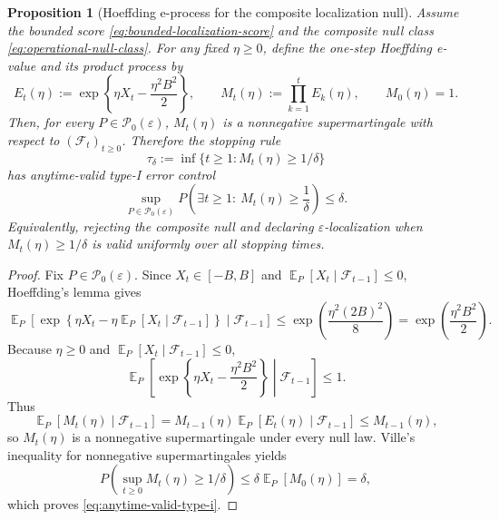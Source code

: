 \documentclass[11pt]{article}
\newtheorem{proposition}[theorem]{Proposition}
\DeclareMathOperator{\E}{\mathbb{E}}
\begin{document}
\begin{proposition}[Hoeffding e-process for the composite localization null]\label{prop:hoeffding-eprocess-composite}
Assume the bounded score \eqref{eq:bounded-localization-score} and the composite null class \eqref{eq:operational-null-class}.  For any fixed $\eta\geq0$, define the one-step Hoeffding e-value and its product process by
\begin{equation}
        E_t(\eta)
        :=
        \exp\!\left\{\eta X_t-\frac{\eta^2B^2}{2}\right\},
        \qquad
        M_t(\eta)
        :=
        \prod_{k=1}^{t}E_k(\eta),
        \qquad
        M_0(\eta)=1 .
        \label{eq:hoeffding-eprocess}
\end{equation}
Then, for every $P\in\mathcal{P}_0(\varepsilon)$, $M_t(\eta)$ is a nonnegative supermartingale with respect to $(\mathcal{F}_t)_{t\geq0}$.  Therefore the stopping rule
\[
        \tau_\delta
        :=
        \inf\{t\geq1:M_t(\eta)\geq1/\delta\}
\]
has anytime-valid type-I error control
\begin{equation}
        \sup_{P\in\mathcal{P}_0(\varepsilon)}
        P\!\left(\exists t\geq1:\ M_t(\eta)\geq\frac{1}{\delta}\right)
        \leq
        \delta .
        \label{eq:anytime-valid-type-i}
\end{equation}
Equivalently, rejecting the composite null and declaring $\varepsilon$-localization when $M_t(\eta)\geq1/\delta$ is valid uniformly over all stopping times.
\end{proposition}

\begin{proof}
Fix $P\in\mathcal{P}_0(\varepsilon)$.  Since $X_t\in[-B,B]$ and $\E_P[X_t\mid\mathcal{F}_{t-1}]\leq0$, Hoeffding's lemma gives
\[
        \E_P\!\left[
        \exp\!\left\{\eta X_t-\eta\E_P[X_t\mid\mathcal{F}_{t-1}]\right\}
        \middle| \mathcal{F}_{t-1}
        \right]
        \leq
        \exp\!\left(\frac{\eta^2(2B)^2}{8}\right)
        =
        \exp\!\left(\frac{\eta^2B^2}{2}\right).
\]
Because $\eta\geq0$ and $\E_P[X_t\mid\mathcal{F}_{t-1}]\leq0$,
\[
        \E_P\!\left[
        \exp\!\left\{\eta X_t-\frac{\eta^2B^2}{2}\right\}
        \middle| \mathcal{F}_{t-1}
        \right]
        \leq
        1 .
\]
Thus
\[
        \E_P[M_t(\eta)\mid\mathcal{F}_{t-1}]
        =
        M_{t-1}(\eta)
        \E_P[E_t(\eta)\mid\mathcal{F}_{t-1}]
        \leq
        M_{t-1}(\eta),
\]
so $M_t(\eta)$ is a nonnegative supermartingale under every null law.  Ville's inequality for nonnegative supermartingales yields
\[
        P\!\left(\sup_{t\geq0}M_t(\eta)\geq1/\delta\right)
        \leq
        \delta\E_P[M_0(\eta)]
        =
        \delta,
\]
which proves \eqref{eq:anytime-valid-type-i}.
\end{proof}
\end{document}
